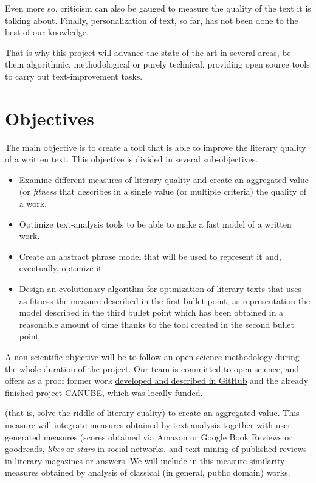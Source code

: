 \documentclass[a4paper,12pt,twocolumn]{article}
\begin{document}
Even more so, criticism can also be gauged to measure the
quality of the text it is talking about. Finally, personalization of
text, so far, has not been done to the best of our knowledge.

That is why this project will advance the state of the art in several
areas, be them algorithmic, methodological or purely technical,
providing open source tools to carry out text-improvement tasks. 

\section{Objectives}
\label{sec:obj}

The main objective is to create a tool that is able to improve the literary
quality of a written text. This objective is divided in several
sub-objectives. \begin{itemize}
\item Examine different measures of literary quality and create an
  aggregated value (or {\em fitness} that describes in a single value
  (or multiple criteria) the quality of a work.
\item Optimize text-analysis tools to be able to make a fast model of
  a written work.
\item Create an abstract phrase model that will be used to represent
  it and, eventually, optimize it
\item Design an evolutionary algorithm for optmization of literary
  texts that uses as fitness the measure described in the first bullet
  point, as representation the model described in the third bullet
  point which has been obtained in a reasonable amount of time thanks
  to the tool created in the second bullet point
\end{itemize}

A non-scientific objective will be to follow an open science
methodology during the whole duration of the project. Our team is
committed to open science, and offers as a proof former work \href{http://github.com/JJ}{developed
and described in GitHub} and the already finished project
\href{http://canube.wordpress.com}{CANUBE}, which was locally funded.




(that is, solve
  the riddle of literary cuality) to create an aggregated value. This
  measure will integrate measures obtained by text analysis together
  with user-generated measures (scores obtained via Amazon or Google
  Book Reviews or goodreads, {\em likes} or {\em stars} in social
  networks, and text-mining of published reviews in literary magazines
  or answers. We will include in this measure similarity measures
  obtained by analysis of classical (in general, public domain)
  works. 
\end{document}
